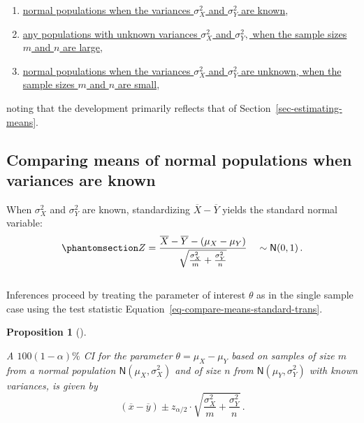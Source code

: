 \documentclass[
  a4paper,
  DIV=11,
  numbers=noendperiod,
  oneside]{scrreprt}
\providecommand{\tightlist}{%
  \setlength{\itemsep}{0pt}\setlength{\parskip}{0pt}}
\theoremstyle{plain}
\theoremstyle{definition}
\theoremstyle{definition}
\theoremstyle{definition}
\theoremstyle{plain}
\newtheorem{proposition}{Proposition}[chapter]
\theoremstyle{remark}
\begin{document}
\begin{enumerate}
\def\labelenumi{\arabic{enumi}.}
\tightlist
\item
  \hyperref[sec-compare-means-normpops-vars-known]{normal populations
  when the variances \(\sigma_X^2\) and \(\sigma_Y^2\) are known},
\item
  \hyperref[sec-compare-means-large-samples]{any populations with
  unknown variances \(\sigma_X^2\) and \(\sigma_Y^2,\) when the sample
  sizes \(m\) and \(n\) are large},
\item
  \hyperref[sec-compare-means-normpops-vars-unknown]{normal populations
  when the variances \(\sigma_X^2\) and \(\sigma_Y^2\) are unknown, when
  the sample sizes \(m\) and \(n\) are small},
\end{enumerate}

noting that the development primarily reflects that of
Section~\ref{sec-estimating-means}.

\subsection{Comparing means of normal populations when variances are
known}\label{sec-compare-means-normpops-vars-known}

When \(\sigma_X^2\) and \(\sigma_Y^2\) are known, standardizing
\(\overline{X} - \overline{Y}\) yields the standard normal variable:
\begin{equation}\phantomsection\label{eq-compare-means-standard-trans}{
 Z = \frac{\overline{X} - \overline{Y} - (\mu_X - \mu_Y)}{\sqrt{\frac{\sigma_X^2}{m} + \frac{\sigma_Y^2}{n}}}\quad \sim \mathsf{N}(0,1)\,.
}\end{equation}\\
Inferences proceed by treating the parameter of interest \(\theta\) as
in the single sample case using the test statistic
Equation~\ref{eq-compare-means-standard-trans}.

\begin{proposition}[]\protect\hypertarget{prp-ci-compare-means-normpops-vars-known}{}\label{prp-ci-compare-means-normpops-vars-known}

A \(100(1-\alpha)\%\) CI for the parameter \(\theta = \mu_X - \mu_Y\)
based on samples of size \(m\) from a normal population
\(\mathsf{N}(\mu_X, \sigma_X^2)\) and of size \(n\) from
\(\mathsf{N}(\mu_Y, \sigma_Y^2)\) with known variances, is given by \[
 (\overline{x} - \overline{y}) \pm z_{\alpha/2} 
 \cdot \sqrt{\frac{\sigma_X^2}{m} + \frac{\sigma_Y^2}{n}} \,.
\]

\end{proposition}
\end{document}
